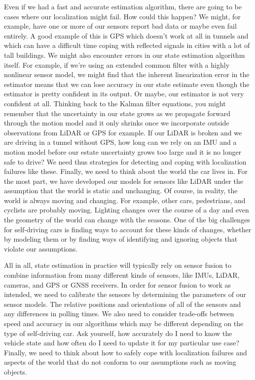Even if we had a fast and accurate estimation algorithm, there are going to be cases where our localization might fail. How could this happen? We might, for example, have one or more of our sensors report bad data or maybe even fail entirely. A good example of this is GPS which doesn't work at all in tunnels and which can have a difficult time coping with reflected signals in cities with a lot of tall buildings. We might also encounter errors in our state estimation algorithm itself. For example, if we're using an extended common filter with a highly nonlinear sensor model, we might find that the inherent linearization error in the estimator means that we can lose accuracy in our state estimate even though the estimator is pretty confident in its output. Or maybe, our estimator is not very confident at all. Thinking back to the Kalman filter equations, you might remember that the uncertainty in our state grows as we propagate forward through the motion model and it only shrinks once we incorporate outside observations from LiDAR or GPS for example. If our LiDAR is broken and we are driving in a tunnel without GPS, how long can we rely on an IMU and a motion model before our estate uncertainty grows too large and it is no longer safe to drive? We need thus strategies for detecting and coping with localization failures like these. Finally, we need to think about the world the car lives in. 
For the most part, we have developed our models for sensors like LiDAR under the assumption that the world is static and unchanging. Of course, in reality, the world is always moving and changing. 
For example, other cars, pedestrians, and cyclists are probably moving. Lighting changes over the course of a day and even the geometry of the world can change with the seasons. 
One of the big challenges for self-driving cars is finding ways to account for these kinds of changes, whether by modeling them or by finding ways of identifying and ignoring objects that violate our assumptions. 

All in all, state estimation in practice will typically rely on sensor fusion to combine information from many different kinds of sensors, like IMUs, LiDAR, cameras, and GPS or GNSS receivers. In order for sensor fusion to work as intended, we need to calibrate the sensors by determining the parameters of our sensor models. The relative positions and orientations of all of the sensors and any differences in polling times. We also need to consider trade-offs between speed and accuracy in our algorithms which may be different depending on the type of self-driving car. Ask yourself, how accurately do I need to know the vehicle state and how often do I need to update it for my particular use case? Finally, we need to think about how to safely cope with localization failures and aspects of the world that do not conform to our assumptions such as moving objects. 

